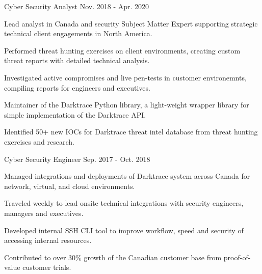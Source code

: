 \begin{cventries}
  \cventry
    {Cyber Security Analyst} %
    {} %
    {} %
    {Nov. 2018 - Apr. 2020} %
    {
      \begin{cvitems} %
        \item {Lead analyst in Canada and security Subject Matter Expert supporting strategic technical client engagements in North America.}
        \item {Performed threat hunting exercises on client environments, creating custom threat reports with detailed technical analysis.}
        \item {Investigated active compromises and live pen-tests in customer environemnts, compiling reports for engineers and executives.}
        \item {Maintainer of the Darktrace Python library, a light-weight wrapper library for simple implementation of the Darktrace API.}
        \item {Identified 50+ new IOCs for Darktrace threat intel database from threat hunting exercises and research.}
      \end{cvitems}
    }

  \cventry
    {Cyber Security Engineer} %
    {} %
    {} %
    {Sep. 2017 - Oct. 2018} %
    {
      \begin{cvitems} %
        \item {Managed integrations and deployments of Darktrace system across Canada for network, virtual, and cloud environments.}
        \item {Traveled weekly to lead onsite technical integrations with security engineers, managers and executives.}
        \item {Developed internal SSH CLI tool to improve workflow, speed and security of accessing internal resources.}
        \item {Contributed to over 30\% growth of the Canadian customer base from proof-of-value customer trials.}
      \end{cvitems}
    }


\end{cventries}

